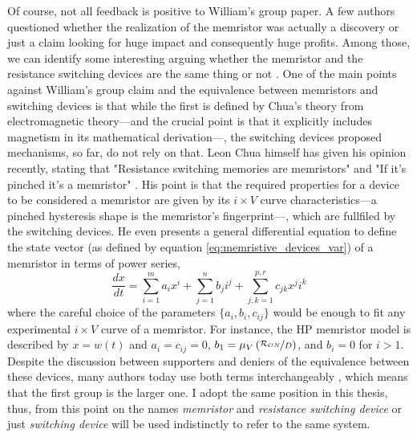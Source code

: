 Of course, not all feedback is positive to William's group paper. A few authors questioned whether the realization of the memristor was actually a discovery or just a claim looking for huge impact and consequently huge profits. Among those, we can identify some interesting arguing whether the memristor and the resistance switching devices are the same thing or not \cite{Gale2014}. One of the main points against William's group claim and the equivalence between memristors and switching devices is that while the first is defined by Chua's theory from electromagnetic theory---and the crucial point is that it explicitly includes magnetism in its mathematical derivation---, the switching devices proposed mechanisms, so far, do not rely on that. Leon Chua himself has given his opinion recently, stating that "Resistance switching memories are memristors" \cite{Chua2011} and "If it's pinched it's a memristor" \cite{Chua2014}. His point is that the required properties for a device to be considered a memristor are given by its $i \times V$ curve characteristics---a pinched hysteresis shape is the memristor's fingerprint---, which are fullfiled by the switching devices. He even presents a general differential equation to define the state vector (as defined by equation \ref{eq:memristive_devices_var}) of a memristor in terms of power series,
\begin{equation}
  \frac{dx}{dt} = \sum_{i=1}^m a_i x^i + \sum_{j=1}^n b_j i^j + \sum_{j,k=1}^{p,r} c_{jk} x^j i^k
  \label{eq:chua_2011}
\end{equation}
where the careful choice of the parameters \(\{a_i, b_i, c_{ij}\}\) would be enough to fit any experimental $i \times V$ curve of a memristor. For instance, the HP memristor model is described by \(x = w(t)\) and \(a_i = c_{ij} = 0\), \(b_1 = \mu_V \left(\nicefrac{\mathcal{R}_{ON}}{D}\right)\), and \(b_i = 0\) for \(i>1\). Despite the discussion between supporters and deniers of the equivalence between these devices, many authors today use both terms interchangeably \cite{Yang2012,Waser2009,Szot2011,Strachan2009}, which means that the first group is the larger one. I adopt the same position in this thesis, thus, from this point on the names {\em memristor} and {\em resistance switching device} or just {\em switching device} will be used indistinctly to refer to the same system. 

